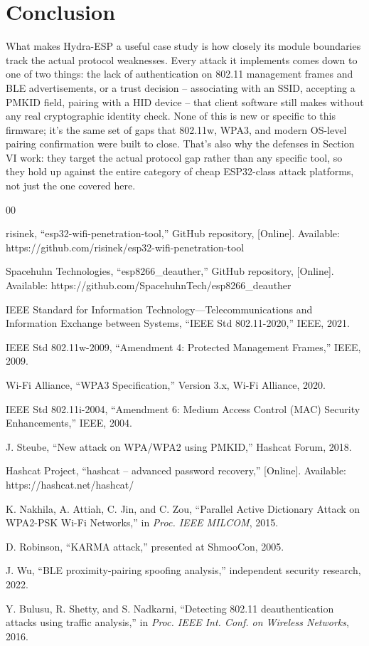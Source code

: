\documentclass[conference]{IEEEtran}
\begin{document}
\section{Conclusion}

What makes Hydra-ESP a useful case study is how closely its module boundaries track the actual protocol weaknesses. Every attack it implements comes down to one of two things: the lack of authentication on 802.11 management frames and BLE advertisements, or a trust decision -- associating with an SSID, accepting a PMKID field, pairing with a HID device -- that client software still makes without any real cryptographic identity check. None of this is new or specific to this firmware; it's the same set of gaps that 802.11w, WPA3, and modern OS-level pairing confirmation were built to close. That's also why the defenses in Section VI work: they target the actual protocol gap rather than any specific tool, so they hold up against the entire category of cheap ESP32-class attack platforms, not just the one covered here.

\begin{thebibliography}{00}

 risinek, ``esp32-wifi-penetration-tool,'' GitHub repository, [Online]. Available: https://github.com/risinek/esp32-wifi-penetration-tool

 Spacehuhn Technologies, ``esp8266\_deauther,'' GitHub repository, [Online]. Available: https://github.com/SpacehuhnTech/esp8266_deauther

 IEEE Standard for Information Technology---Telecommunications and Information Exchange between Systems, ``IEEE Std 802.11-2020,'' IEEE, 2021.

 IEEE Std 802.11w-2009, ``Amendment 4: Protected Management Frames,'' IEEE, 2009.

 Wi-Fi Alliance, ``WPA3 Specification,'' Version 3.x, Wi-Fi Alliance, 2020.

 IEEE Std 802.11i-2004, ``Amendment 6: Medium Access Control (MAC) Security Enhancements,'' IEEE, 2004.

 J. Steube, ``New attack on WPA/WPA2 using PMKID,'' Hashcat Forum, 2018.

 Hashcat Project, ``hashcat -- advanced password recovery,'' [Online]. Available: https://hashcat.net/hashcat/

 K. Nakhila, A. Attiah, C. Jin, and C. Zou, ``Parallel Active Dictionary Attack on WPA2-PSK Wi-Fi Networks,'' in \emph{Proc. IEEE MILCOM}, 2015.

 D. Robinson, ``KARMA attack,'' presented at ShmooCon, 2005.

 J. Wu, ``BLE proximity-pairing spoofing analysis,'' independent security research, 2022.

 Y. Bulusu, R. Shetty, and S. Nadkarni, ``Detecting 802.11 deauthentication attacks using traffic analysis,'' in \emph{Proc. IEEE Int. Conf. on Wireless Networks}, 2016.

\end{thebibliography}
\end{document}
